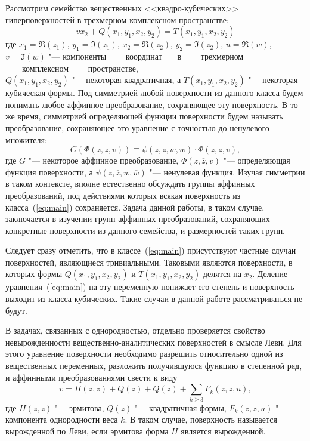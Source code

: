 \documentclass[../main.tex]{subfiles}
\begin{document}
Рассмотрим семейство вещественных <<квадро-кубических>> гиперповерхностей в трехмерном комплексном пространстве:
\begin{equation}\label{eq:main}
v x_2 + Q(x_1, y_1, x_2, y_2) = T(x_1, y_1, x_2, y_2)
\end{equation}
где $x_1 = \Re(z_1)$, $y_1 = \Im(z_1)$, $x_2 = \Re(z_2)$, $y_2 = \Im(z_2)$, $u = \Re(w)$, $v= \Im(w)$ "--- компоненты~~~~ координат ~~~в ~~~~трехмерном ~~~~комплексном ~~~~пространстве, \\$Q(x_1, y_1, x_2, y_2)$ "--- некоторая квадратичная, а $T(x_1, y_1, x_2, y_2)$ "--- некоторая кубическая формы. Под симметрией любой поверхности из данного класса будем понимать любое аффинное преобразование, сохраняющее эту поверхность. В то же время, симметрией определяющей функции поверхности будем называть преобразование, сохраняющее это уравнение с точностью до ненулевого множителя:
\begin{equation}\label{eq:preservation}
G(\Phi(z, \overline{z}, v)) \equiv \psi(z, \overline{z}, w, \overline{w}) \cdot \Phi(z, \overline{z}, v),
\end{equation}
где $G$ "--- некоторое аффинное преобразование, $\Phi(z, \overline z, v)$ "--- определяющая функция поверхности, а $\psi(z, \overline z, w, \overline w)$ "--- ненулевая функция. Изучая симметрии в таком контексте, вполне естественно обсуждать группы аффинных преобразований, под действиями которых всякая поверхность из класса~(\ref{eq:main}) сохраняется. Задача данной работы, в таком случае, заключается в изучении групп аффинных преобразований, сохраняющих конкретные поверхности из данного семейства, и размерностей таких групп.

Следует сразу отметить, что в классе~(\ref{eq:main}) присутствуют частные случаи поверхностей, являющиеся тривиальными. Таковыми являются поверхности, в которых формы $Q(x_1, y_1, x_2, y_2)$ и $T(x_1, y_1, x_2, y_2)$ делятся на $x_2$. Деление уравнения~(\ref{eq:main}) на эту переменную понижает его степень и поверхность выходит из класса кубических. Такие случаи в данной работе рассматриваться не будут.

В задачах, связанных с однородностью, отдельно проверяется свойство невырожденности вещественно-аналитических поверхностей в смысле Леви. Для этого уравнение поверхности необходимо разрешить относительно одной из вещественных переменных, разложить получившуюся функцию в степенной ряд, и аффинными преобразованиями свести к виду
\begin{equation}
v = H(z, \overline z) + Q(z) + \overline{Q(z)} + \sum_{k \ge 3} F_k(z, \overline z, u),
\end{equation}
где $H(z, \overline z)$ "--- эрмитова, $Q(z)$ "--- квадратичная формы, $F_k(z, \overline z, u)$ "--- компонента однородности веса $k$. В таком случае, поверхность называется вырожденной по Леви, если эрмитова форма $H$ является вырожденной.
\end{document}
